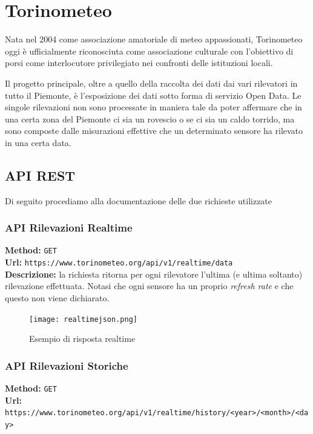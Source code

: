 \section{Torinometeo}
Nata nel 2004 come associazione amatoriale di meteo appassionati, Torinometeo oggi è ufficialmente
riconosciuta come associazione culturale con l'obiettivo di porsi come interlocutore privilegiato
nei confronti delle istituzioni locali.

Il progetto principale, oltre a quello della raccolta dei dati dai vari rilevatori in tutto il Piemonte, è
l'esposizione dei dati sotto forma di servizio Open Data. Le singole rilevazioni non sono processate
in maniera tale da poter affermare che in una certa zona del Piemonte ci sia un rovescio o se ci sia
un caldo torrido, ma sono composte dalle misurazioni effettive che un determinato sensore ha rilevato
in una certa data.

\subsection{API REST}
Di seguito procediamo alla documentazione delle due richieste utilizzate

\subsubsection{API Rilevazioni Realtime}
\textbf{Method:} \texttt{GET} \\
\textbf{Url:} \texttt{https://www.torinometeo.org/api/v1/realtime/data} \\

\noindent\textbf{Descrizione:} la richiesta ritorna per ogni rilevatore l'ultima (e ultima soltanto)
rilevazione effettuata. Notasi che ogni sensore ha un proprio \emph{refresh rate} e che questo non viene
dichiarato.

\begin{figure}[H]
\centering
\texttt{[image: realtimejson.png]}
\caption*{Esempio di risposta realtime}
\label{fig:realtimejson}
\end{figure}


\subsubsection{API Rilevazioni Storiche}
\textbf{Method:} \texttt{GET} \\
\textbf{Url:} \texttt{https://www.torinometeo.org/api/v1/realtime/history/<year>/<month>/<day>} \\

